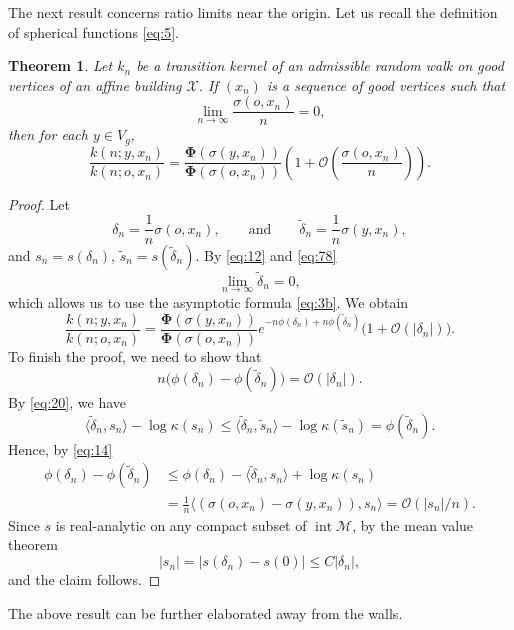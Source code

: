 \documentclass[11pt]{amsart}
\newcommand{\calO}{\mathcal{O}}
\newcommand{\calM}{\mathcal{M}}
\newcommand{\scrX}{\mathscr{X}}
\newcommand{\sprod}[2]{\langle {#1}, {#2} \rangle}
\newcommand{\inter}{\operatorname{int}}
\theoremstyle{plain}
\newcounter{thm}
\newtheorem{theorem}{Theorem}[section]
\theoremstyle{definition}
\numberwithin{equation}{section}
\begin{document}
The next result concerns ratio limits near the origin. Let us recall the definition of spherical functions \eqref{eq:5}.
\begin{theorem}
	\label{thm:5}
	Let $k_n$ be a transition kernel of an admissible random walk on good vertices of an affine building $\scrX$.
	If $(x_n)$ is a sequence of good vertices such that
	\begin{equation}
		\label{eq:78}
		\lim_{n \to \infty} \frac{\sigma(o, x_n)}{n} = 0,
	\end{equation}
	then for each $y \in V_g$,
	\[
		\frac{k(n; y, x_n)}{k(n; o, x_n)}
		=
		\frac{\mathbf{\Phi}(\sigma(y, x_n))}{\mathbf{\Phi}(\sigma(o, x_n))}  
		\left(1+\calO\left(\frac{\sigma(o, x_n)}{n} \right)\right).
	\]
\end{theorem} 
\begin{proof}
	Let
	\[
		\delta_n = \frac{1}{n} \sigma(o, x_n), \qquad\text{and}\qquad
		\tilde{\delta}_n = \frac{1}{n} \sigma(y, x_n),
	\]
	and $s_n = s(\delta_n)$, $\tilde{s}_n = s(\tilde{\delta}_n)$. By \eqref{eq:12} and \eqref{eq:78}
	\[
		\lim_{n \to \infty} \tilde{\delta}_n = 0,
	\]
	which allows us to use the asymptotic formula \eqref{eq:3b}. We obtain
	\[
		\frac{k(n; y, x_n)}{k(n; o, x_n)}
		=
		\frac{\mathbf{\Phi}(\sigma(y, x_n))}{\mathbf{\Phi}(\sigma(o, x_n))}
		e^{-n\phi(\delta_n) + n \phi(\tilde{\delta}_n)} 
		\Big(1 + \calO(|\delta_n|)\Big).
	\]
	To finish the proof, we need to show that
	\[
		n \big(\phi(\delta_n) - \phi(\tilde{\delta}_n)\big) = \calO(|\delta_n|).
	\]
	By \eqref{eq:20}, we have
	\[
		\sprod{\tilde{\delta}_n}{s_n} - \log \kappa(s_n)
		\leqslant 
		\sprod{\tilde{\delta}_n}{\tilde{s}_n} 
		- 
		\log \kappa(\tilde{s}_n)= \phi(\tilde{\delta}_n).
	\]
	Hence, by \eqref{eq:14}
	\begin{align*}
		\phi(\delta_n)- \phi(\tilde{\delta}_n) 
		&\leqslant 
		\phi(\delta_n)- \sprod{\tilde{\delta}_n}{s_n} + \log\kappa(s_n)\\
		&=\frac{1}{n} \sprod{(\sigma(o, x_n) - \sigma(y, x_n))}{s_n} = \mathcal{O}(|s_n|/n).
	\end{align*}
	Since $s$ is real-analytic on any compact subset of $\inter \calM$, by the mean value theorem
	\[
		|s_n| = |s(\delta_n) - s(0)| \leqslant C |\delta_n|,
	\]
	and the claim follows.
\end{proof}

The above result can be further elaborated away from the walls.
	
\end{document}
